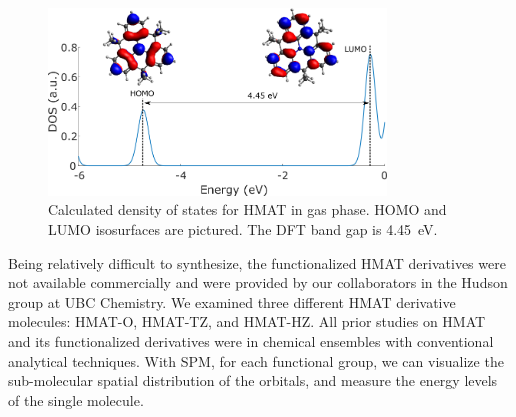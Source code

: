 \begin{figure} [h]
    \centering
    \includegraphics[width=0.8\textwidth]{pictures/HMAT_diagram.png}
    \caption{Calculated density of states for HMAT in gas phase. HOMO and LUMO isosurfaces are pictured. The DFT band gap is \SI{4.45}{eV}. }
    \label{fig:oled:dft-hmat}
\end{figure}

Being relatively difficult to synthesize, the functionalized \ac{HMAT} derivatives were not available commercially and were provided by our collaborators in the Hudson group at \ac{UBC} Chemistry. We examined three different \ac{HMAT} derivative molecules: \ac{HMAT-O}, \ac{HMAT-TZ}, and \ac{HMAT-HZ}. All prior studies on \ac{HMAT} and its functionalized derivatives were in chemical ensembles with conventional analytical techniques. With \ac{SPM}, for each functional group, we can visualize the sub-molecular spatial distribution of the orbitals, and measure the energy levels of the single molecule. 







